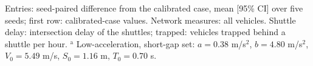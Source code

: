 \begin{table}[htbp]
{\begin{tabular}{lccccccc}
    \bottomrule
    \end{tabular}}
  \par\vspace{3pt}\parbox{\textwidth}{\footnotesize Entries: seed-paired difference from the calibrated case, mean [95\% CI] over five seeds; first row: calibrated-case values. Network measures: all vehicles. Shuttle delay: intersection delay of the shuttles; trapped: vehicles trapped behind a shuttle per hour. $^{\mathrm{a}}$ Low-acceleration, short-gap set: $a = 0.38$ m/s$^2$, $b = 4.80$ m/s$^2$, $V_0 = 5.49$ m/s, $S_0 = 1.16$ m, $T_0 = 0.70$ s.}
  \label{tab:sens_idm}
\end{table}
